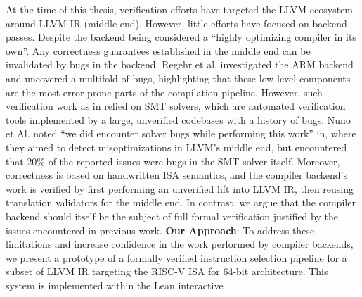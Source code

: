 \documentclass[review, anonymous, acmsmall, screen]{acmart}
\begin{document}
At the time of this thesis, verification efforts have targeted the LLVM ecosystem around LLVM IR 
(middle end). However, little efforts have focused on backend passes. Despite the backend being considered a ``highly
optimizing compiler in its own''. Any correctness guarantees established in the middle
end can be invalidated by bugs in the backend. Regehr et al. investigated the ARM
backend and uncovered a multifold of bugs, highlighting that these low-level components are the most
error-prone parts of the compilation pipeline. However, such  verification work as in
relied on SMT solvers, which are automated verification tools implemented by a large, unverified 
codebases with a history of bugs. Nuno et Al. noted ``we did encounter solver bugs while performing 
this work'' in, where they aimed to detect misoptimizations in LLVM’s middle end, but encountered that
20\% of the reported issues were bugs in the SMT solver itself. Moreover, correctness is based on 
handwritten ISA semantics, and the compiler backend's work is verified by first performing an unverified
lift into LLVM IR, then reusing translation validators for the middle end. In contrast, we argue that the
compiler backend should itself be the subject of full formal verification justified by the issues 
encountered in previous work.\newline
\textbf{Our Approach}:
To address these limitations and increase confidence in the work performed by compiler backends, we 
present a prototype of a formally verified instruction selection pipeline for a subset of LLVM IR 
targeting the RISC-V ISA for 64-bit architecture. This system is implemented within the Lean interactive
\end{document}
